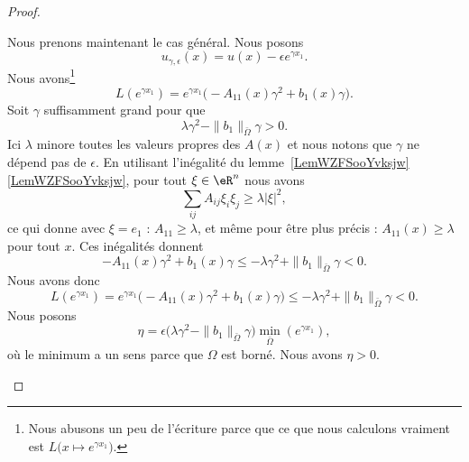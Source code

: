 \begin{proof}
\begin{subproof}
		Nous prenons maintenant le cas général. Nous posons
		\begin{equation}
			u_{\gamma,\epsilon}(x)=u(x)-\epsilon e^{\gamma x_1}.
		\end{equation}
		Nous avons\footnote{Nous abusons un peu de l'écriture parce que ce que nous calculons vraiment est \( L\big( x\mapsto  e^{\gamma x_1} \big)\).}
		\begin{equation}
			L( e^{\gamma x_1})= e^{\gamma x_1}\big( -A_{11}(x)\gamma^2+b_1(x)\gamma \big).
		\end{equation}
		Soit \( \gamma\) suffisamment grand pour que
		\begin{equation}
			\lambda\gamma^2-\| b_1 \|_{\bar \Omega}\gamma>0.
		\end{equation}
		Ici \( \lambda\) minore toutes les valeurs propres des \( A(x)\) et nous notons que \( \gamma\) ne dépend pas de \( \epsilon\). En utilisant l'inégalité du lemme~\ref{LemWZFSooYvksjw}\ref{LemWZFSooYvksjw}, pour tout \( \xi\in \eR^n\) nous avons
		\begin{equation}
			\sum_{ij}A_{ij}\xi_i\xi_j\geq \lambda| \xi |^2,
		\end{equation}
		ce qui donne avec \( \xi=e_1\) : \( A_{11}\geq \lambda\), et même pour être plus précis : \( A_{11}(x)\geq \lambda\) pour tout \( x\). Ces inégalités donnent
		\begin{equation}
			-A_{11}(x)\gamma^2+b_1(x)\gamma\leq -\lambda\gamma^2+\| b_1 \|_{\bar \Omega}\gamma<0.
		\end{equation}
		Nous avons donc
		\begin{equation}        \label{EQooXCGQooLGMnvL}
			L( e^{\gamma x_1})= e^{\gamma x_1}\big( -A_{11}(x)\gamma^2+b_1(x)\gamma \big)\leq  -\lambda\gamma^2+\| b_1 \|_{\bar \Omega}\gamma<0.
		\end{equation}
		Nous posons
		\begin{equation}
			\eta=\epsilon\big( \lambda\gamma^2-\| b_1 \|_{\bar\Omega}\gamma \big)\min_{\bar \Omega}( e^{\gamma x_1}),
		\end{equation}
		où le minimum a un sens parce que \( \Omega\) est borné. Nous avons \( \eta>0\).


\end{subproof}
\end{proof}
